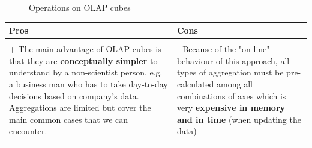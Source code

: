 \begin{figure} [h] %
\centerline{
}
\centerline{
}
\caption{\label{OLAP_operations} Operations on OLAP cubes} 
\end{figure}

\begin{center} %
\begin{tabular} {| l | l |}
\hline
\bf Pros & \bf Cons \\ \hline
& \\
\parbox[t][][t]{7cm}{+ The main advantage of OLAP cubes is that they are \textbf{conceptually simpler} to understand by a non-scientist person, e.g. a business man who has to take day-to-day decisions based on company's data. Aggregations are limited but cover the main common cases that we can encounter.
}&
\parbox[t][][t]{7cm}{- Because of the "on-line" behaviour of this approach, all types of aggregation must be pre-calculated among all combinations of axes which is very \textbf{expensive in memory and in time} (when updating the data)}\\
& \\
\hline
\end{tabular}
\end{center}

\clearpage
